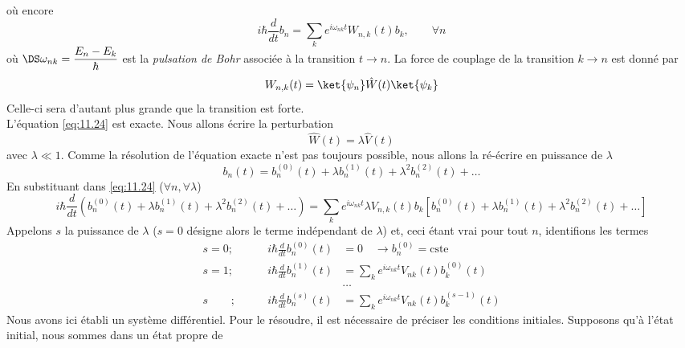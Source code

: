 		où encore
		\begin{equation}
		i\hbar \dfrac{d}{dt}b_n = \sum_k e^{i\omega_{nk}t} W_{n,k}(t)b_k,\qquad \forall n
		\label{eq:11.24}
		\end{equation}
		où $\DS \omega_{nk} = \dfrac{E_n-E_k}{\hbar}$ est la \textit{pulsation de Bohr} associée à 
		la transition $t\rightarrow n$. La force de couplage de la transition $k\rightarrow n$ est 
		donné par 
		\begin{equation}
		W_{n,k}(t) = \ket{\psi_n}\hat{W}(t)\ket{\psi_k}
		\end{equation}
		Celle-ci sera d'autant plus grande que la transition est forte.\\
		L'équation \eqref{eq:11.24} est exacte. Nous allons écrire la perturbation
		\begin{equation}
		\hat{W}(t) = \lambda\hat{V}(t)
		\end{equation}
		avec $\lambda \ll 1$. Comme la résolution de l'équation exacte n'est pas toujours possible, 
		nous allons la ré-écrire en puissance de $\lambda$ 
		\begin{equation}
		b_n(t) = b_n^{(0)}(t) + \lambda b_n^{(1)}(t) + \lambda^2 b_n^{(2)}(t)+\dots
		\end{equation}
		En substituant dans \eqref{eq:11.24} ($\forall n, \forall\lambda$)
		\begin{equation}
		i\hbar \dfrac{d}{dt}(b_n^{(0)}(t) + \lambda b_n^{(1)}(t) + \lambda^2 b_n^{(2)}(t)+\dots) = 
		\sum_k e^{i\omega_{nk}t} \lambda V_{n,k}(t)b_k[b_n^{(0)}(t) + \lambda b_n^{(1)}(t) + 
		\lambda^2 b_n^{(2)}(t)+\dots]
		\end{equation}
		Appelons $s$ la puissance de $\lambda$ ($s=0$ désigne alors le terme indépendant de 
		$\lambda$) et, ceci étant vrai pour tout $n$, identifions les termes
		\begin{equation}
		\begin{array}{lll}
		s=0; &\qquad i\hbar\frac{d}{dt}b_n^{(0)}(t) &= 0\quad \rightarrow b_n^{(0)} = \text{cste}\\
		s=1; &\qquad i\hbar\frac{d}{dt}b_n^{(1)}(t) &= \sum_k e^{i\omega_{nk}t}V_{nk}(t)b_k^{(0)}(t)\\
		&&\dots\\
		s\phantom{=1}\ ; &\qquad i\hbar\frac{d}{dt}b_n^{(s)}(t) &= \sum_k e^{i\omega_{nk}t}V_{nk}(t)b_k^{(s-1)}(t)
		\end{array}
		\end{equation}
		Nous avons ici établi un système différentiel. Pour le résoudre, il est nécessaire de préciser 
		les conditions initiales. Supposons qu'à l'état initial, nous sommes dans un état propre de 
